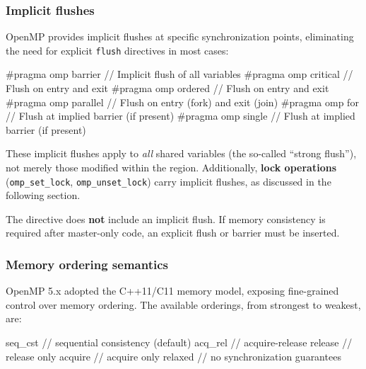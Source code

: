 \subsubsection{Implicit flushes}

OpenMP provides implicit flushes at specific synchronization points, eliminating the need for explicit \texttt{flush} directives in most cases:

\begin{codeblock}[language = C]
#pragma omp barrier     // Implicit flush of all variables
#pragma omp critical    // Flush on entry and exit
#pragma omp ordered     // Flush on entry and exit
#pragma omp parallel    // Flush on entry (fork) and exit (join)
#pragma omp for         // Flush at implied barrier (if present)
#pragma omp single      // Flush at implied barrier (if present)
\end{codeblock}

These implicit flushes apply to \emph{all} shared variables (the so-called ``strong flush''), not merely those modified within the region. Additionally, \textbf{lock operations} (\texttt{omp\_set\_lock}, \texttt{omp\_unset\_lock}) carry implicit flushes, as discussed in the following section.

\begin{warningblock}
The  directive does \textbf{not} include an implicit flush. If memory consistency is required after master-only code, an explicit flush or barrier must be inserted.
\end{warningblock}

\subsubsection{Memory ordering semantics}

OpenMP 5.x adopted the C++11/C11 memory model, exposing fine-grained control over memory ordering. The available orderings, from strongest to weakest, are:

\begin{codeblock}[language = C]
seq_cst   // sequential consistency (default)
acq_rel   // acquire-release
release   // release only
acquire   // acquire only
relaxed   // no synchronization guarantees
\end{codeblock}

